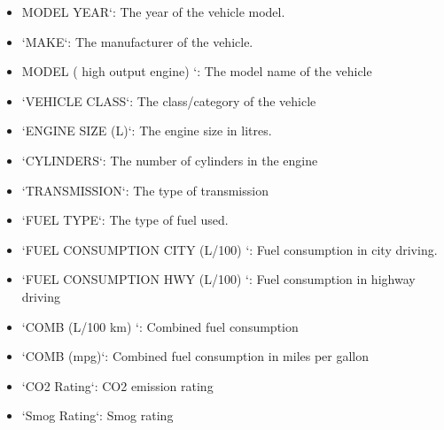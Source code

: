\documentclass[12pt, a4paper,oneside]{book}
\numberwithin{equation}{section}
\begin{document}
\begin{itemize}
    \item MODEL YEAR`: The year of the vehicle model.
\end{itemize}
\begin{itemize}
    \item `MAKE`: The manufacturer of the vehicle.
\end{itemize}
\begin{itemize}
    \item MODEL ( high output engine) `: The model name of the vehicle 
\end{itemize}
\begin{itemize}
    \item `VEHICLE CLASS`: The class/category of the vehicle 
\end{itemize}
\begin{itemize}
    \item`ENGINE SIZE (L)`: The engine size in litres.
\end{itemize}
\begin{itemize}
    \item `CYLINDERS`: The number of cylinders in the engine 
\end{itemize}
\begin{itemize}
    \item `TRANSMISSION`: The type of transmission 
\end{itemize}
\begin{itemize}
    \item `FUEL TYPE`: The type of fuel used.
\end{itemize}
\begin{itemize}
    \item `FUEL CONSUMPTION CITY (L/100) `: Fuel consumption in city driving.
\end{itemize}
\begin{itemize}
    \item  `FUEL CONSUMPTION HWY (L/100) `: Fuel consumption in highway driving
\end{itemize}
\begin{itemize}
    \item `COMB (L/100 km) `: Combined fuel consumption
\end{itemize}
\begin{itemize}
    \item `COMB (mpg)`: Combined fuel consumption in miles per gallon 
\end{itemize}
\begin{itemize}
    \item `CO2 Rating`: CO2 emission rating 
\end{itemize}
\begin{itemize}
    \item `Smog Rating`: Smog rating 
\end{itemize}
\end{document}
